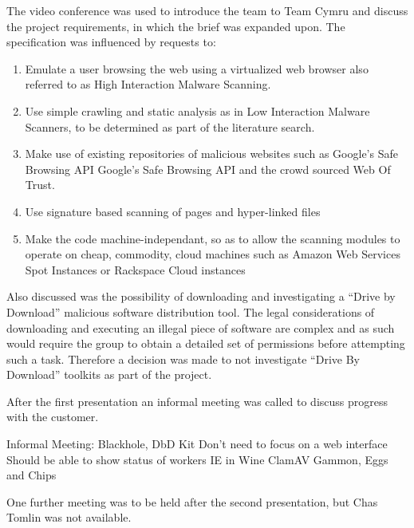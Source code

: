 The video conference was used to introduce the team to Team Cymru and discuss the project requirements, in which the brief was expanded upon. The specification was influenced by requests to:
\begin{enumerate}
    \item Emulate a user browsing the web using a virtualized web browser also referred to as High Interaction Malware Scanning.

    \item Use simple crawling and static analysis as in Low Interaction Malware Scanners, to be determined as part of the literature search.

    \item Make use of existing repositories of malicious websites such as Google's Safe Browsing API\cite{google-safe} Google's Safe Browsing API and the crowd sourced Web Of Trust.

    \item Use signature based scanning of pages and hyper-linked files

    \item Make the code machine-independant, so as to allow the scanning modules to operate on cheap, commodity, cloud machines such as Amazon Web Services Spot Instances\cite{aws-spot} or Rackspace Cloud instances\cite{rackspace}
\end{enumerate}

Also discussed was the possibility of downloading and investigating a ``Drive by Download'' malicious software distribution tool.  The legal considerations of downloading and executing an illegal piece of software are complex and as such would require the group to obtain a detailed set of permissions before attempting such a task. Therefore a decision was made to not investigate ``Drive By Download'' toolkits as part of the project.

After the first presentation an informal meeting was called to discuss progress with the customer.

Informal Meeting:
    Blackhole, DbD Kit
    Don't need to focus on a web interface
    Should be able to show status of workers
    IE in Wine
    ClamAV
    Gammon, Eggs and Chips

One further meeting was to be held after the second presentation, but Chas Tomlin was not available.

